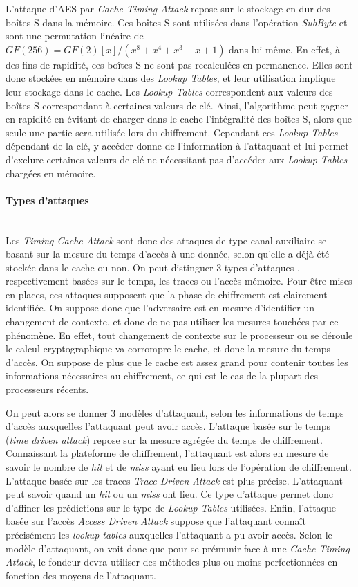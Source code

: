 \documentclass[a4paper,11pt]{article}
\begin{document}
L'attaque d'AES par \emph{Cache Timing Attack} repose sur le stockage en dur des boîtes S dans la mémoire. Ces boîtes S sont utilisées dans l'opération \emph{SubByte} et sont une permutation linéaire de $ GF(256) = GF(2)[x]/(x^8+x^4+x^3+x+1) $ dans lui même. En effet, à des fins de rapidité, ces boîtes S ne sont pas recalculées en permanence. Elles sont donc stockées en mémoire dans des \emph{Lookup Tables}, et leur utilisation implique leur stockage dans le cache. Les \emph{Lookup Tables} correspondent aux valeurs des boîtes S correspondant à certaines valeurs de clé. Ainsi, l'algorithme peut gagner en rapidité en évitant de charger dans le cache l'intégralité des boîtes S, alors que seule une partie sera utilisée lors du chiffrement. Cependant ces \emph{Lookup Tables} dépendant de la clé, y accéder donne de l'information à l'attaquant et lui permet d'exclure certaines valeurs de clé ne nécessitant pas d'accéder aux \emph{Lookup Tables} chargées en mémoire.

\paragraph{Types d'attaques}~\\
Les \emph{Timing Cache Attack} sont donc des attaques de type canal auxiliaire se basant sur la mesure du temps d'accès à une donnée, selon qu'elle a déjà été stockée dans le cache ou non. On peut distinguer 3 types d'attaques \cite{aciiccmez2006trace}, respectivement basées sur le temps, les traces ou l'accès mémoire.
Pour être mises en places, ces attaques supposent que la phase de chiffrement est clairement identifiée. On suppose donc que l'adversaire est en mesure d'identifier un changement de contexte, et donc de ne pas utiliser les mesures touchées par ce phénomène. En effet, tout changement de contexte sur le processeur ou se déroule le calcul cryptographique va corrompre le cache, et donc la mesure du temps d'accès.
On suppose de plus que le cache est assez grand pour contenir toutes les informations nécessaires au chiffrement, ce qui est le cas de la plupart des processeurs récents.

On peut alors se donner 3 modèles d'attaquant, selon les informations de temps d'accès auxquelles l'attaquant peut avoir accès.
L'attaque basée sur le temps (\emph{time driven attack}) repose sur la mesure agrégée du temps de chiffrement. Connaissant la plateforme de chiffrement, l'attaquant est alors en mesure de savoir le nombre de \emph{hit} et de \emph{miss} ayant eu lieu lors de l'opération de chiffrement.
L'attaque basée sur les traces \emph{Trace Driven Attack} est plus précise. L'attaquant peut savoir quand un \emph{hit} ou un \emph{miss} ont lieu. Ce type d'attaque permet donc d'affiner les prédictions sur le type de \emph{Lookup Tables} utilisées.
Enfin, l'attaque basée sur l'accès \emph{Access Driven Attack} suppose que l'attaquant connaît précisément les \emph{lookup tables} auxquelles l'attaquant a pu avoir accès.
Selon le modèle d'attaquant, on voit donc que pour se prémunir face à une \emph{Cache Timing Attack}, le fondeur devra utiliser des méthodes plus ou moins perfectionnées en fonction des moyens de l'attaquant.
\end{document}

